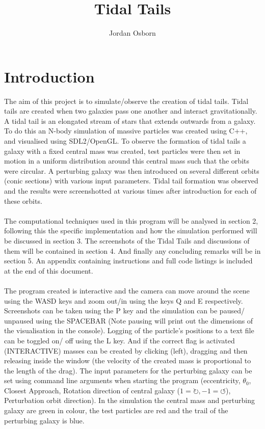 \documentclass[10pt,a4paper]{article}
\begin{document}
\begin{titlingpage}
\title{Tidal Tails}
\author{Jordan Osborn}
\maketitle
\begin{abstract}
	
\end{abstract}
	
	
\end{titlingpage}

\clearpage
\section{Introduction}
The aim of this project is to simulate/observe the creation of tidal tails. Tidal tails are created when two galaxies pass one another and interact gravitationally. A tidal tail is an elongated stream of stars that extends outwards from a galaxy.  To do this an N-body simulation of massive particles was created using C++, and visualised using SDL2/OpenGL. To observe the formation of tidal tails a galaxy with a fixed central mass was created, test particles were then set in motion in a uniform distribution around this central mass such that the orbits were circular. A perturbing galaxy was then introduced on several different orbits (conic sections) with various input parameters. Tidal tail formation was observed and the results were screenshotted at various times after introduction for each of these orbits. 
\\
\\
The computational techniques used in this program will be analysed in section 2, following this the specific implementation and how the simulation performed will be discussed in section 3. The screenshots of the Tidal Tails and discussions of them will be contained in section 4. And finally any concluding remarks will be in section 5. An appendix containing instructions and full code listings is included at the end of this document. 
\\
\\
The program created is interactive and the camera can move around the scene using the WASD keys and zoom out/in using the keys Q and E respectively. Screenshots can be taken using the P key and the simulation can be paused/ unpaused using the SPACEBAR (Note pausing will print out the dimensions of the visualisation in the console). Logging of the particle's positions to a text file can be toggled on/ off using the L key. And if the correct flag is activated (INTERACTIVE) masses can be created by clicking (left), dragging and then releasing inside the window (the velocity of the created mass is proportional to the length of the drag). The input parameters for the perturbing galaxy can be set using command line arguments when starting the program (eccentricity, $\theta_0$, Closest Approach, Rotation direction of central galaxy ($1=\circlearrowright, -1=\circlearrowleft$), Perturbation orbit direction). In the simulation the central mass and perturbing galaxy are green in colour, the test particles are red and the trail of the perturbing galaxy is blue.
\end{document}

